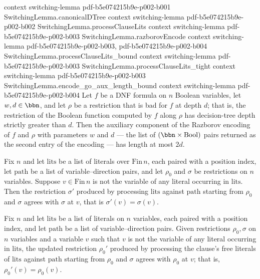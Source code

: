 \begin{lemma}
  {context}
  {switching-lemma}
  {pdf-b5e074215b9e-p002-b001}
\proofstep
  {SwitchingLemma.canonicalDTree}
  {context}
  {switching-lemma}
  {pdf-b5e074215b9e-p002-b002}
\proofstep
  {SwitchingLemma.processClauseLits}
  {context}
  {switching-lemma}
  {pdf-b5e074215b9e-p002-b003}
\proofstep
  {SwitchingLemma.razborovEncode}
  {context}
  {switching-lemma}
  {pdf-b5e074215b9e-p002-b003,
    pdf-b5e074215b9e-p002-b004}
\proofstep
  {SwitchingLemma.processClauseLits_bound}
  {context}
  {switching-lemma}
  {pdf-b5e074215b9e-p002-b003}
\proofstep
  {SwitchingLemma.processClauseLits_tight}
  {context}
  {switching-lemma}
  {pdf-b5e074215b9e-p002-b003}
\proofstep
  {SwitchingLemma.encode_go_aux_length_bound}
  {context}
  {switching-lemma}
  {pdf-b5e074215b9e-p002-b004}
Let $f$ be a DNF formula on $n$ Boolean variables, let $w, d \in \bbn$, and let $\rho$
be a restriction that is bad for $f$ at depth $d$; that is, the restriction of the
Boolean function computed by $f$ along $\rho$ has decision-tree depth strictly greater
than $d$. Then the auxiliary component of the Razborov encoding of $f$ and $\rho$ with
parameters $w$ and $d$ — the list of $(\bbn \times \mathrm{Bool})$ pairs returned as the
second entry of the encoding — has length at most $2d$.
\end{lemma}

\begin{lemma}
\label{SwitchingLemma.processClauseLits_sigma_stable}
\leanok
{}
Fix $n$ and let $\mathrm{lits}$ be a list of literals over $\mathrm{Fin}\,n$, each
paired with a position index, let $\mathrm{path}$ be a list of variable–direction pairs,
and let $\rho_0$ and $\sigma$ be restrictions on $n$ variables. Suppose $v \in
\mathrm{Fin}\,n$ is not the variable of any literal occurring in $\mathrm{lits}$. Then
the restriction $\sigma'$ produced by processing $\mathrm{lits}$ against $\mathrm{path}$
starting from $\rho_0$ and $\sigma$ agrees with $\sigma$ at $v$, that is $\sigma'(v) =
\sigma(v)$.
\end{lemma}

\begin{lemma}
\label{SwitchingLemma.processClauseLits_rho_stable}
\leanok
{}
Fix $n$ and let $\mathrm{lits}$ be a list of literals on $n$ variables, each paired with
a position index, and let $\mathrm{path}$ be a list of variable–direction pairs. Given
restrictions $\rho_0,\sigma$ on $n$ variables and a variable $v$ such that $v$ is not
the variable of any literal occurring in $\mathrm{lits}$, the updated restriction
$\rho_0'$ produced by processing the clause's free literals of $\mathrm{lits}$ against
$\mathrm{path}$ starting from $\rho_0$ and $\sigma$ agrees with $\rho_0$ at $v$; that
is, $\rho_0'(v) = \rho_0(v)$.
\end{lemma}

